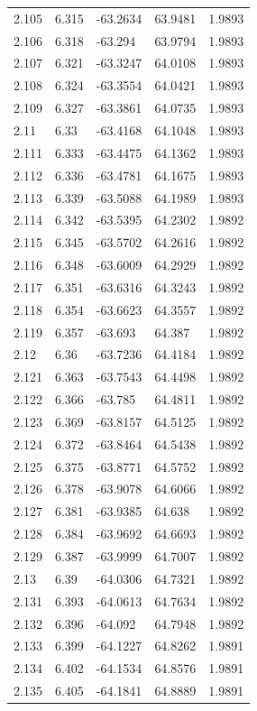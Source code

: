 \begin{tabular}{lllll}
2.105 & 6.315 & -63.2634 & 63.9481 & 1.9893 \\
2.106 & 6.318 & -63.294 & 63.9794 & 1.9893 \\
2.107 & 6.321 & -63.3247 & 64.0108 & 1.9893 \\
2.108 & 6.324 & -63.3554 & 64.0421 & 1.9893 \\
2.109 & 6.327 & -63.3861 & 64.0735 & 1.9893 \\
2.11 & 6.33 & -63.4168 & 64.1048 & 1.9893 \\
2.111 & 6.333 & -63.4475 & 64.1362 & 1.9893 \\
2.112 & 6.336 & -63.4781 & 64.1675 & 1.9893 \\
2.113 & 6.339 & -63.5088 & 64.1989 & 1.9893 \\
2.114 & 6.342 & -63.5395 & 64.2302 & 1.9892 \\
2.115 & 6.345 & -63.5702 & 64.2616 & 1.9892 \\
2.116 & 6.348 & -63.6009 & 64.2929 & 1.9892 \\
2.117 & 6.351 & -63.6316 & 64.3243 & 1.9892 \\
2.118 & 6.354 & -63.6623 & 64.3557 & 1.9892 \\
2.119 & 6.357 & -63.693 & 64.387 & 1.9892 \\
2.12 & 6.36 & -63.7236 & 64.4184 & 1.9892 \\
2.121 & 6.363 & -63.7543 & 64.4498 & 1.9892 \\
2.122 & 6.366 & -63.785 & 64.4811 & 1.9892 \\
2.123 & 6.369 & -63.8157 & 64.5125 & 1.9892 \\
2.124 & 6.372 & -63.8464 & 64.5438 & 1.9892 \\
2.125 & 6.375 & -63.8771 & 64.5752 & 1.9892 \\
2.126 & 6.378 & -63.9078 & 64.6066 & 1.9892 \\
2.127 & 6.381 & -63.9385 & 64.638 & 1.9892 \\
2.128 & 6.384 & -63.9692 & 64.6693 & 1.9892 \\
2.129 & 6.387 & -63.9999 & 64.7007 & 1.9892 \\
2.13 & 6.39 & -64.0306 & 64.7321 & 1.9892 \\
2.131 & 6.393 & -64.0613 & 64.7634 & 1.9892 \\
2.132 & 6.396 & -64.092 & 64.7948 & 1.9892 \\
2.133 & 6.399 & -64.1227 & 64.8262 & 1.9891 \\
2.134 & 6.402 & -64.1534 & 64.8576 & 1.9891 \\
2.135 & 6.405 & -64.1841 & 64.8889 & 1.9891 \\

\end{tabular}
